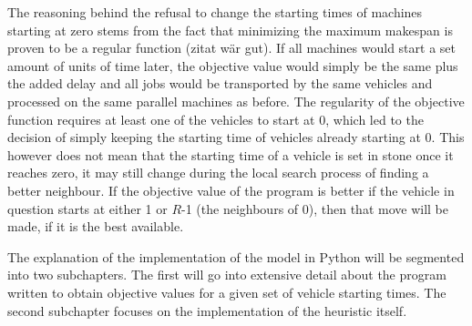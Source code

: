 The reasoning behind the refusal to change the starting times of machines starting at zero stems from the fact that minimizing the maximum makespan
is proven to be a regular function (zitat wär gut). If all machines would start a set amount of units of time later, the objective value would simply
be the same plus the added delay and all jobs would be transported by the same vehicles and processed on the same parallel machines as before. The
regularity of the objective function requires at least one of the vehicles to start at 0, which led to the decision of simply keeping the starting
time of vehicles already starting at 0. This however does not mean that the starting time of a vehicle is set in stone once it reaches zero, it may
still change during the local search process of finding a better neighbour. If the objective value of the program is better if the vehicle in question
starts at either 1 or \(R\)-1 (the neighbours of 0), then that move will be made, if it is the best available.

The explanation of the implementation of the model in Python will be segmented into two subchapters. The first will go into extensive detail about
the program written to obtain objective values for a given set of vehicle starting times. The second subchapter focuses on the implementation of the
heuristic itself.